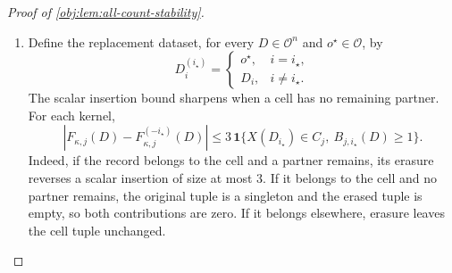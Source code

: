 \documentclass[11pt]{article}
\begin{document}
\begin{proof}[Proof of \cref{obj:lem:all-count-stability}]
\begin{enumerate}
The product law evaluates the event that all unreplaced records avoid cell \(j\), and the event that the old record is isolated in that cell, as
\[
\begin{aligned}
\Pr\{B_{j,i_\star}(D)=0\}
&=\prod_{i\ne i_\star}(1-p_j)
=(1-p_j)^{n-1},\\
\Pr\{X(D_{i_\star})\in C_j,\ B_{j,i_\star}(D)=0\}
&=p_j\prod_{i\ne i_\star}(1-p_j)
=p_j(1-p_j)^{n-1}.
\end{aligned}
\]
Subtracting the isolated-record event from the old record's cell-membership event yields
\[
\begin{aligned}
\Pr\{X(D_{i_\star})\in C_j,\ B_{j,i_\star}(D)\ge1\}
&=p_j-p_j(1-p_j)^{n-1}\\
&=p_j\bigl[1-(1-p_j)^{n-1}\bigr].
\end{aligned}
\]
For the independent replacement, the corresponding event is a product of its cell-membership event and the event that the unreplaced records have a partner. Hence
\[
\Pr\{X(o^\star)\in C_j,\ B_{j,i_\star}(D)\ge1\}
=p_j\bigl[1-(1-p_j)^{n-1}\bigr].
\]
These formulas include \(p_j=0\) and \(p_j=1\), since \(n-1\ge1\). Summing the cell indicators and using \(n>0\), we obtain
\[
\begin{aligned}
\mathbb E J_{i_\star}^{\mathrm{old}}
=\mathbb E J_{i_\star}^{\mathrm{new}}
&=\sum_{j=1}^k p_j\bigl[1-(1-p_j)^{n-1}\bigr]
=\frac{W(P)}n,\\
\mathbb E\bigl[J_{i_\star}^{\mathrm{old}}
+J_{i_\star}^{\mathrm{new}}\bigr]
&=\frac{2W(P)}n.
\end{aligned}
\]

\item Define the replacement dataset, for every \(D\in\mathcal O^n\) and \(o^\star\in\mathcal O\), by
\[
D_i^{(i_\star)}
=
\begin{cases}
o^\star,&i=i_\star,\\
D_i,&i\ne i_\star.
\end{cases}
\]
The scalar insertion bound sharpens when a cell has no remaining partner. For each kernel,
\[
\left|F_{\kappa,j}(D)-F_{\kappa,j}^{(-i_\star)}(D)\right|
\le
3\,\mathbf1\{X(D_{i_\star})\in C_j,\ B_{j,i_\star}(D)\ge1\}.
\]
Indeed, if the record belongs to the cell and a partner remains, its erasure reverses a scalar insertion of size at most \(3\). If it belongs to the cell and no partner remains, the original tuple is a singleton and the erased tuple is empty, so both contributions are zero. If it belongs elsewhere, erasure leaves the cell tuple unchanged.


\end{enumerate}
\end{proof}
\end{document}
